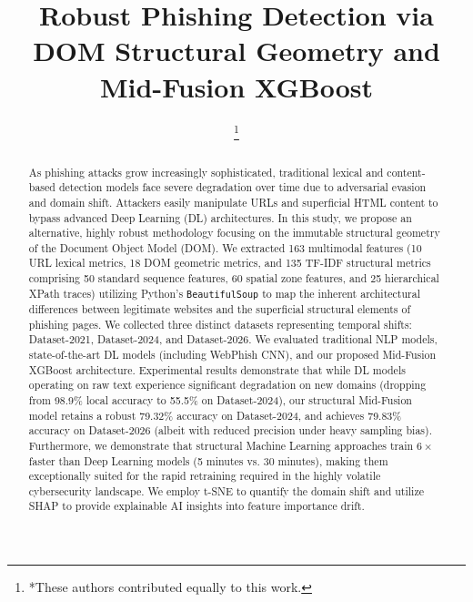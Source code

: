 \documentclass[conference]{IEEEtran}
\begin{document}
\title{Robust Phishing Detection via DOM Structural Geometry and Mid-Fusion XGBoost}

\author{
     \thanks{*These authors contributed equally to this work.} \\
}

\maketitle

\begin{abstract}
As phishing attacks grow increasingly sophisticated, traditional lexical and content-based detection models face severe degradation over time due to adversarial evasion and domain shift. Attackers easily manipulate URLs and superficial HTML content to bypass advanced Deep Learning (DL) architectures. In this study, we propose an alternative, highly robust methodology focusing on the immutable structural geometry of the Document Object Model (DOM). We extracted 163 multimodal features (10 URL lexical metrics, 18 DOM geometric metrics, and 135 TF-IDF structural metrics comprising 50 standard sequence features, 60 spatial zone features, and 25 hierarchical XPath traces) utilizing Python's \texttt{BeautifulSoup} to map the inherent architectural differences between legitimate websites and the superficial structural elements of phishing pages. We collected three distinct datasets representing temporal shifts: Dataset-2021, Dataset-2024, and Dataset-2026. We evaluated traditional NLP models, state-of-the-art DL models (including WebPhish CNN), and our proposed Mid-Fusion XGBoost architecture. Experimental results demonstrate that while DL models operating on raw text experience significant degradation on new domains (dropping from 98.9\% local accuracy to 55.5\% on Dataset-2024), our structural Mid-Fusion model retains a robust 79.32\% accuracy on Dataset-2024, and achieves 79.83\% accuracy on Dataset-2026 (albeit with reduced precision under heavy sampling bias). Furthermore, we demonstrate that structural Machine Learning approaches train $6\times$ faster than Deep Learning models (5 minutes vs. 30 minutes), making them exceptionally suited for the rapid retraining required in the highly volatile cybersecurity landscape. We employ t-SNE to quantify the domain shift and utilize SHAP to provide explainable AI insights into feature importance drift.
\end{abstract}
\end{document}
